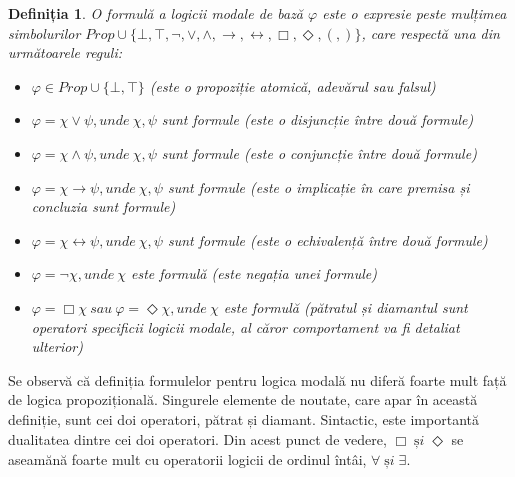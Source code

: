 \documentclass[12pt, openany]{book}
\newtheorem{definition}{Definiția}[chapter] %
\begin{document}
            \begin{definition}
            \label{def_basic_synthax}
                O formulă a logicii modale de bază $\varphi$ este o expresie peste mulțimea simbolurilor $Prop 
                \cup \{\bot, \top, \neg, \vee, \wedge, \rightarrow, \leftrightarrow, \Box, \Diamond, (, )\}$, care 
                respectă una din următoarele reguli:
                \begin{itemize}
                    \item $\varphi \in Prop \cup \{\bot, \top\}$ (este o propoziție atomică, adevărul 
                    sau falsul)
                    \item $\varphi = \chi \vee \psi, unde\: \chi,\psi$ sunt formule (este o disjuncție între două 
                    formule)
                    \item $\varphi = \chi \wedge \psi, unde\: \chi,\psi$ sunt formule (este o conjuncție între 
                    două formule)
                    \item $\varphi = \chi \rightarrow \psi, unde\: \chi,\psi$ sunt formule (este o implicație 
                    în care premisa și concluzia sunt formule)
                    \item $\varphi = \chi \leftrightarrow \psi, unde\: \chi,\psi$ sunt formule (este o echivalență 
                    între două formule)
                    \item $\varphi = \neg \chi, unde\: \chi$ este formulă (este negația unei formule)
                    \item $\varphi = \Box \chi\: sau\: \varphi = \Diamond \chi, unde\: \chi$ este formulă (pătratul 
                    și diamantul sunt operatori specificii logicii modale, al căror comportament va fi detaliat 
                    ulterior)
                \end{itemize}
            \end{definition}

            \par{}
                Se observă că definiția formulelor pentru logica modală nu diferă foarte mult față de 
                logica propozițională. Singurele elemente de noutate, care apar în această definiție, sunt cei 
                doi operatori, pătrat și diamant. Sintactic, este importantă dualitatea dintre cei 
                doi operatori. Din acest punct de vedere, $\Box\; și\; \Diamond$ se 
                aseamănă foarte mult cu operatorii logicii de ordinul întâi, $\forall\; și\; \exists$.
\end{document}
